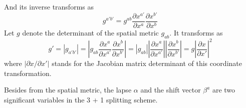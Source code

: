\documentclass[letterpaper,nofootinbib,prd,amsmath,onecolumn]{revtex4-1}
\begin{document}
And its inverse transforms as
\begin{equation}
g^{a'b'} = g^{ab}\frac{\partial x^{a'}}{\partial x^{a}}\frac{\partial x^{b'}}{\partial x^{b}}\label{spatial metric}
\end{equation}
Let $g$ denote the determinant of the spatial metric $g_{ab}$. It transforms as
\begin{equation}
g' = |g_{a'b'}| = |g_{ab}\frac{\partial x^{a}}{\partial x^{a'}}\frac{\partial x^{b}}{\partial x^{b'}}| = |g_{ab}||\frac{\partial x^{a}}{\partial x^{a'}}||\frac{\partial x^{b}}{\partial x^{b'}}| = g|\frac{\partial x}{\partial x'}|^{2}
\end{equation}
where $|\partial x/\partial x'|$ stands for the Jacobian matrix determinant of this coordinate transformation. 


Besides from the spatial metric, the lapse $\alpha$ and the shift vector $\beta^{a}$ are two significant variables in the 3 + 1 splitting scheme. 
\end{document}
